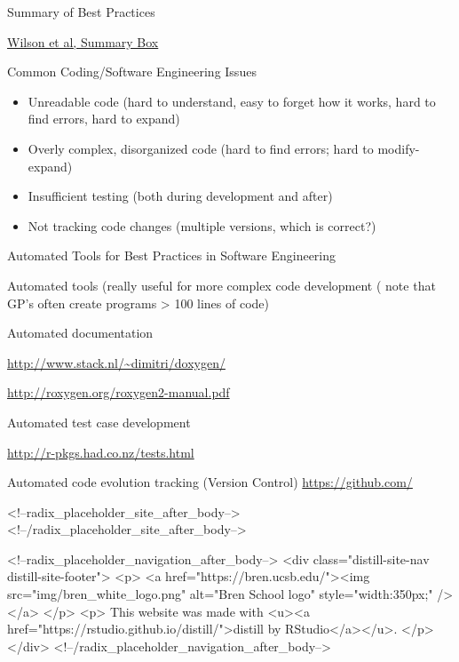 \documentclass[
  ignorenonframetext,
]{beamer}
\providecommand{\tightlist}{%
  \setlength{\itemsep}{0pt}\setlength{\parskip}{0pt}}
\begin{document}
\begin{frame}{Summary of Best Practices}
\protect\hypertarget{summary-of-best-practices}{}

\href{https://journals.plos.org/plosbiology/article?id=10.1371/journal.pbio.1001745\#pbio-1001745-box001}{Wilson
et al, Summary Box}

\end{frame}

\begin{frame}{Common Coding/Software Engineering Issues}
\protect\hypertarget{common-codingsoftware-engineering-issues}{}

\begin{itemize}
\tightlist
\item
  Unreadable code (hard to understand, easy to forget how it works, hard
  to find errors, hard to expand)
\item
  Overly complex, disorganized code (hard to find errors; hard to
  modify-expand)
\item
  Insufficient testing (both during development and after)
\item
  Not tracking code changes (multiple versions, which is correct?)
\end{itemize}

\end{frame}

\begin{frame}{Automated Tools for Best Practices in Software
Engineering}
\protect\hypertarget{automated-tools-for-best-practices-in-software-engineering}{}

Automated tools (really useful for more complex code development ( note
that GP's often create programs \textgreater{} 100 lines of code)

Automated documentation

\url{http://www.stack.nl/~dimitri/doxygen/}

\url{http://roxygen.org/roxygen2-manual.pdf}

Automated test case development

\url{http://r-pkgs.had.co.nz/tests.html}

Automated code evolution tracking (Version Control)
\url{https://github.com/}

\end{frame}

<!--radix_placeholder_site_after_body-->
<!--/radix_placeholder_site_after_body-->

<!--radix_placeholder_navigation_after_body-->
<div class="distill-site-nav distill-site-footer">
<p>
<a href="https://bren.ucsb.edu/"><img src="img/bren_white_logo.png" alt="Bren School logo" style="width:350px;" /></a>
</p>
<p>
  This website was made with <u><a href="https://rstudio.github.io/distill/">distill by RStudio</a></u>.
</p>
</div>
<!--/radix_placeholder_navigation_after_body-->
\end{document}
